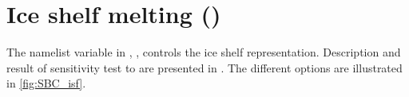 \documentclass[../main/NEMO_manual]{subfiles}
\begin{document}
\section{Ice shelf melting (\protect{})}
\label{sec:SBC_isf}

The namelist variable in , , controls the ice shelf representation.
Description and result of sensitivity test to  are presented in \citet{Mathiot2017}. 
The different options are illustrated in \autoref{fig:SBC_isf}.
\end{document}
